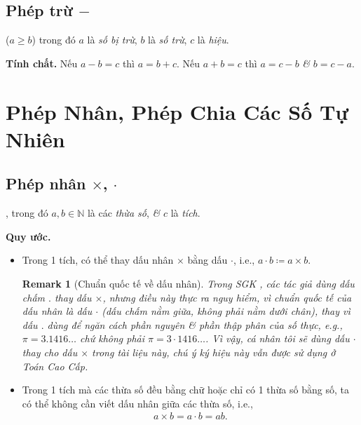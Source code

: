 \documentclass[oneside]{book}
\numberwithin{equation}{section}
\newtheorem{remark}{Remark}[section]
\begin{document}
\subsection{Phép trừ $-$}
 ($a\ge b$) trong đó $a$ là \textit{số bị trừ}, $b$ là \textit{số trừ}, $c$ là \textit{hiệu}.

\noindent\textbf{Tính chất.} Nếu $a - b = c$ thì $a = b + c$. Nếu $a + b = c$ thì $a = c - b$ \textit{\&} $b = c - a$.


\section{Phép Nhân, Phép Chia Các Số Tự Nhiên}

\subsection{Phép nhân $\times$, $\cdot$}
, trong đó $a,b\in\mathbb{N}$ là các \textit{thừa số}, \textit{\&} $c$ là \textit{tích}.

\noindent\textbf{Quy ước.}
\begin{itemize}
	\item Trong 1 tích, có thể thay dấu nhân $\times$ bằng dấu $\cdot$, i.e., $a\cdot b\coloneqq a\times b$.
	
	\begin{remark}[Chuẩn quốc tế về dấu nhân]
		Trong SGK \cite[p. 18]{Thai_Anh_Dat_Ha_Loan_Nam_Quang_Toan_6_tap_1}, các tác giả dùng dấu chấm $.$ thay dấu $\times$, nhưng điều này thực ra nguy hiểm, vì chuẩn quốc tế của dấu nhân là dấu $\cdot$ (dấu chấm nằm giữa, không phải nằm dưới chân), thay vì dấu $.$ dùng để ngăn cách phần nguyên \textit{\&} phần thập phân của số thực, e.g., $\pi = 3.1416\ldots$ chứ không phải $\pi = 3\cdot 1416\ldots$. Vì vậy, cá nhân tôi sẽ dùng dấu $\cdot$ thay cho dấu $\times$ trong tài liệu này, chú ý ký hiệu này vẫn được sử dụng ở Toán Cao Cấp.
	\end{remark}
	\item Trong 1 tích mà các thừa số đều bằng chữ hoặc chỉ có 1 thừa số bằng số, ta có thể không cần viết dấu nhân giữa các thừa số, i.e.,
	\begin{align*}
		a\times b = a\cdot b = ab.
	\end{align*}
\end{itemize}
\end{document}
